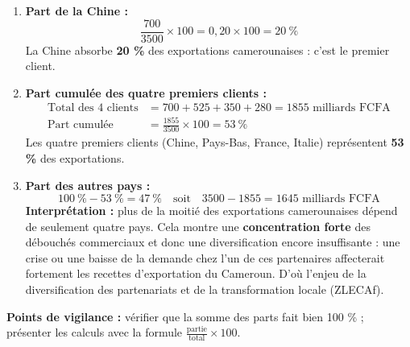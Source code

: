 \documentclass[11pt]{article}
\begin{document}
\begin{corrige}
\begin{enumerate}
\item \textbf{Part de la Chine :}
\[ \frac{700}{3500} \times 100 = 0{,}20 \times 100 = 20\ \% \]
La Chine absorbe \textbf{20 \%} des exportations camerounaises : c'est le premier client.
\item \textbf{Part cumulée des quatre premiers clients :}
\begin{align*}
\text{Total des 4 clients} &= 700 + 525 + 350 + 280 = 1855 \text{ milliards FCFA}\\
\text{Part cumulée} &= \frac{1855}{3500} \times 100 = 53\ \%
\end{align*}
Les quatre premiers clients (Chine, Pays-Bas, France, Italie) représentent \textbf{53 \%} des exportations.
\item \textbf{Part des autres pays :}
\[ 100\ \% - 53\ \% = 47\ \% \quad\text{soit}\quad 3500 - 1855 = 1645 \text{ milliards FCFA} \]
\textbf{Interprétation :} plus de la moitié des exportations camerounaises dépend de seulement quatre pays. Cela montre une \textbf{concentration forte} des débouchés commerciaux et donc une diversification encore insuffisante : une crise ou une baisse de la demande chez l'un de ces partenaires affecterait fortement les recettes d'exportation du Cameroun. D'où l'enjeu de la diversification des partenariats et de la transformation locale (ZLECAf).
\end{enumerate}
\textbf{Points de vigilance :} vérifier que la somme des parts fait bien 100 \% ; présenter les calculs avec la formule $\frac{\text{partie}}{\text{total}} \times 100$.
\end{corrige}
\end{document}

